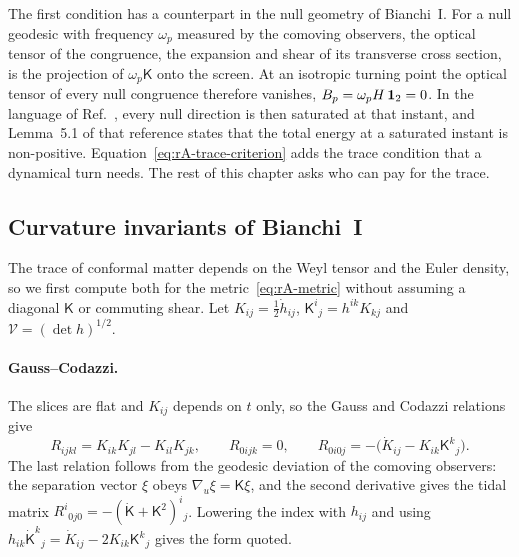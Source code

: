 The first condition has a counterpart in the null geometry of Bianchi~I.
For a null geodesic with frequency $\omega_p$ measured by the comoving observers, the optical tensor of the congruence, the expansion and shear of its transverse cross section, is the projection of $\omega_p\mathsf K$ onto the screen.
At an isotropic turning point the optical tensor of every null congruence therefore vanishes, $B_p=\omega_pH\,\mathbf{1}_2=0$.
In the language of Ref.~\cite{Zhou:2026szo}, every null direction is then saturated at that instant, and Lemma~5.1 of that reference states that the total energy at a saturated instant is non-positive.
Equation~\eqref{eq:rA-trace-criterion} adds the trace condition that a dynamical turn needs.
The rest of this chapter asks who can pay for the trace.

\subsection{Curvature invariants of Bianchi~I}
\label{rA:curvature}

The trace of conformal matter depends on the Weyl tensor and the Euler density, so we first compute both for the metric~\eqref{eq:rA-metric} without assuming a diagonal $\mathsf K$ or commuting shear.
Let $K_{ij}=\tfrac12\dot h_{ij}$, $\mathsf K^i{}_j=h^{ik}K_{kj}$ and $\mathcal V=(\det h)^{1/2}$.

\paragraph{Gauss--Codazzi.}
The slices are flat and $K_{ij}$ depends on $t$ only, so the Gauss and Codazzi relations give
\begin{equation}
R_{ijkl}=K_{ik}K_{jl}-K_{il}K_{jk},\qquad R_{0ijk}=0,\qquad R_{0i0j}=-\big(\dot K_{ij}-K_{ik}\mathsf K^k{}_j\big).
\label{eq:rA-gauss}
\end{equation}
The last relation follows from the geodesic deviation of the comoving observers: the separation vector $\xi$ obeys $\nabla_u\xi=\mathsf K\xi$, and the second derivative gives the tidal matrix $R^i{}_{0j0}=-(\dot{\mathsf K}+\mathsf K^2)^i{}_j$.
Lowering the index with $h_{ij}$ and using $h_{ik}\dot{\mathsf K}^k{}_j=\dot K_{ij}-2K_{ik}\mathsf K^k{}_j$ gives the form quoted.

